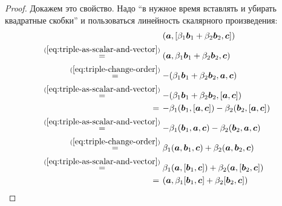\documentclass[a4paper,12pt]{article}
\begin{document}
  \begin{proof}
    Докажем это свойство.
    Надо ``в нужное время вставлять и убирать квадратные скобки'' и пользоваться линейность скалярного произведения:
    \begin{equation}
    \begin{split}
      &(\boldsymbol a, [\beta_1 \boldsymbol b_1 + \beta_2 \boldsymbol b_2, \boldsymbol c])\\
      \stackrel{(\ref{eq:triple-as-scalar-and-vector})}{=} \; &(\boldsymbol a, \beta_1 \boldsymbol b_1 + \beta_2 \boldsymbol b_2, \boldsymbol c)\\
      \stackrel{(\ref{eq:triple-change-order})}{=}         \; &{-}(\beta_1 \boldsymbol b_1 + \beta_2 \boldsymbol b_2, \boldsymbol a, \boldsymbol c)\\
      \stackrel{(\ref{eq:triple-as-scalar-and-vector})}{=} \; &{-}(\beta_1 \boldsymbol b_1 + \beta_2 \boldsymbol b_2, [\boldsymbol a, \boldsymbol c])\\
      \stackrel{\hphantom{(1)}}{=}                         \; &{-}\beta_1(\boldsymbol b_1, [\boldsymbol a, \boldsymbol c]) - \beta_2(\boldsymbol b_2, [\boldsymbol a, \boldsymbol c])\\
      \stackrel{(\ref{eq:triple-as-scalar-and-vector})}{=} \; &{-}\beta_1(\boldsymbol b_1, \boldsymbol a, \boldsymbol c) - \beta_2(\boldsymbol b_2, \boldsymbol a, \boldsymbol c)\\
      \stackrel{(\ref{eq:triple-change-order})}{=}         \; &\beta_1(\boldsymbol a, \boldsymbol b_1, \boldsymbol c) + \beta_2(\boldsymbol a, \boldsymbol b_2, \boldsymbol c)\\
      \stackrel{(\ref{eq:triple-as-scalar-and-vector})}{=} \; &\beta_1(\boldsymbol a, [\boldsymbol b_1, \boldsymbol c]) + \beta_2(\boldsymbol a, [\boldsymbol b_2, \boldsymbol c])\\
      \stackrel{\hphantom{(1)}}{=}                         \; &(\boldsymbol a, \beta_1[\boldsymbol b_1, \boldsymbol c] + \beta_2[\boldsymbol b_2, \boldsymbol c])
    \end{split}
    \end{equation}
  \end{proof}
  
\end{document}
